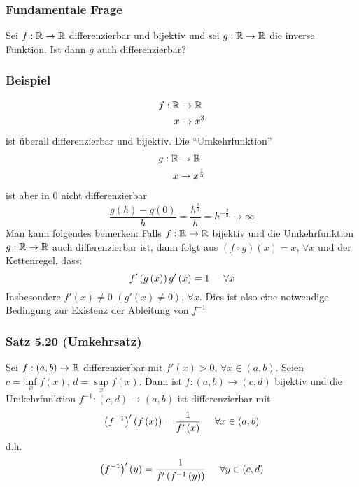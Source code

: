 \subsubsection*{Fundamentale Frage}
Sei $f:\mathbb{R}\to\mathbb{R}$ differenzierbar und bijektiv und sei $g:\mathbb{R}\to\mathbb{R}$ die inverse Funktion. Ist dann $g$ auch differenzierbar?

\subsubsection*{Beispiel}
\begin{align*}
f:\mathbb{R}&\to\mathbb{R}\\
x&\to x^3
\end{align*}
ist überall differenzierbar und bijektiv. Die ``Umkehrfunktion''
\begin{align*}
g:\mathbb{R}&\to\mathbb{R}\\
x&\to x^{1\over 3}
\end{align*}
ist aber in $0$ nicht differenzierbar
\[\frac{{g\left( h \right) - g\left( 0 \right)}}{h} = \frac{{{h^{\frac{1}{3}}}}}{h} = {h^{ - \frac{2}{3}}} \to \infty \]
Man kann folgendes bemerken: Falls $f:\mathbb{R}\to\mathbb{R}$ bijektiv und die Umkehrfunktion $g:\mathbb{R}\to\mathbb{R}$ auch differenzierbar ist, dann folgt aus $\left( f\circ g\right)(x)=x$, $\forall x$ und der Kettenregel, dass:
\[f'\left( {g\left( x \right)} \right)g'\left( x \right) = 1\hspace{5mm}\forall x\]
Insbesondere $f'(x)\not=0$ $\left(g'(x)\not=0\right)$, $\forall x$. Dies ist also eine notwendige Bedingung zur Existenz der Ableitung von $f^{-1}$

\subsubsection*{Satz 5.20 (Umkehrsatz)}\label{satz5.20}
Sei $f:\left( a,b\right)\to\mathbb{R}$ differenzierbar mit $f'(x)>0$, $\forall x\in\left( a,b\right)$. Seien $c = \mathop {\inf }\limits_x f\left( x \right)$, $d = \mathop {\sup }\limits_x f\left( x \right)$. Dann ist $f:\left( a,b\right)\to\left( c,d\right)$ bijektiv und die Umkehrfunktion $f^{-1}:\left( c,d\right)\to\left( a,b\right)$ ist differenzierbar mit
\[\left( {{f^{ - 1}}} \right)'\left( {f\left( x \right)} \right) = \frac{1}{{f'\left( x \right)}}\hspace{5mm}\forall x \in \left( {a,b} \right)\]
d.h.
\[\left( {{f^{ - 1}}} \right)'\left(y \right) = \frac{1}{{f'\left( {{f^{ - 1}}}\left( y\right) \right)}}\hspace{5mm}\forall y \in \left( {c,d} \right)\]

